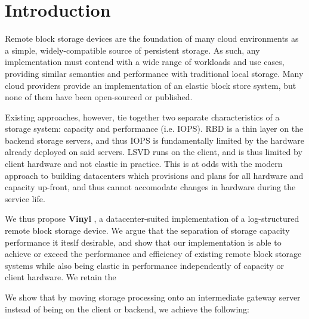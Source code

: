 \section{Introduction}

Remote block storage devices are the foundation of many cloud environments as a
simple, widely-compatible source of persistent storage. As such, any
implementation must contend with a wide range of workloads and use cases,
providing similar semantics and performance with traditional local storage.
Many cloud providers provide an implementation of an elastic block store system,
but none of them have been open-sourced or published.

Existing approaches, however, tie together two separate characteristics of a
storage system: capacity and performance (i.e. IOPS). RBD is a thin layer on the
backend storage servers, and thus IOPS is fundamentally limited by the hardware
already deployed on said servers. LSVD runs on the client, and is thus limited
by client hardware and not elastic in practice. This is at odds with the modern
approach to building datacenters which provisions and plans for all hardware and
capacity up-front, and thus cannot accomodate changes in hardware during the
service life.

We thus propose \textbf{Vinyl} , a datacenter-suited
implementation of a log-structured remote block storage device. We argue that
the separation of storage capacity performance it iteslf desirable, and show
that our implementation is able to achieve or exceed the performance and
efficiency of existing remote block storage systems while also being elastic
in performance independently of capacity or client hardware. We retain the

We show that by moving storage processing onto an intermediate gateway server
instead of being on the client or backend, we achieve the following:


